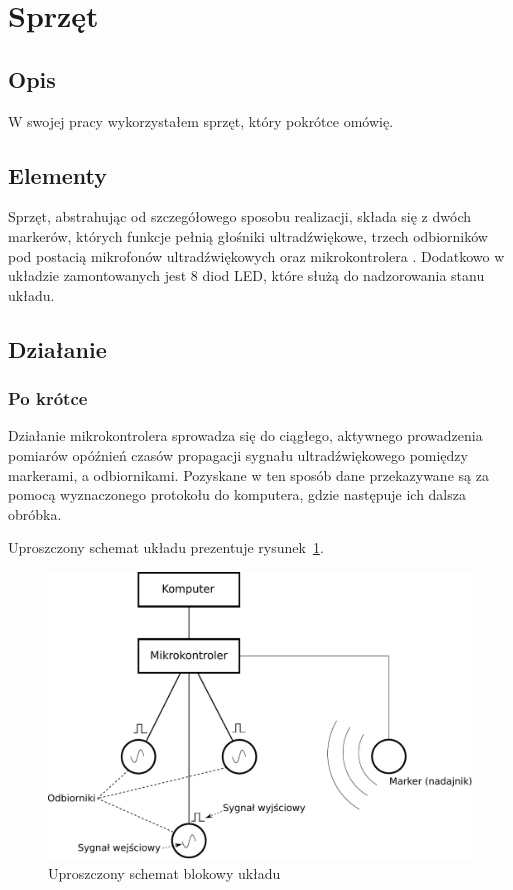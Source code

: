 \label{ch:solution} %

\section{Sprzęt}
\subsection{Opis}
W swojej pracy wykorzystałem sprzęt, który pokrótce omówię.

\subsection{Elementy}
Sprzęt, abstrahując od szczegółowego sposobu realizacji, składa się z dwóch markerów, których funkcje pełnią głośniki ultradźwiękowe, trzech odbiorników pod postacią mikrofonów ultradźwiękowych oraz mikrokontrolera . Dodatkowo w układzie zamontowanych jest 8 diod LED, które służą do nadzorowania stanu układu.

\subsection{Działanie}
\subsubsection{Po krótce}
Działanie mikrokontrolera sprowadza się do ciągłego, aktywnego prowadzenia pomiarów opóźnień czasów propagacji sygnału ultradźwiękowego pomiędzy markerami, a odbiornikami. Pozyskane w ten sposób dane przekazywane są za pomocą wyznaczonego protokołu do komputera, gdzie następuje ich dalsza obróbka.

Uproszczony schemat układu prezentuje rysunek~\ref{fig:device_scheme}.

\begin{figure}
 \includegraphics[width=\textwidth]{gfx/diagramy/schemat_blokowy_ukladu}
 \caption{Uproszczony schemat blokowy układu}
 \label{fig:device_scheme}
\end{figure}


